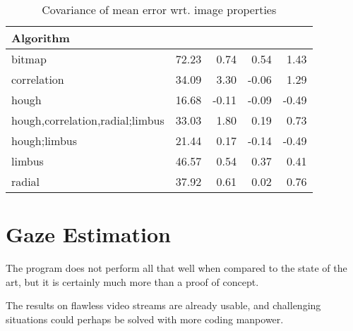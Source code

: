 \begin{table}[b!]
\centering
\begin{tabular}{l@{\hspace{1.5cm}}D{.}{.}{3.2}D{.}{.}{3.2}D{.}{.}{3.2}D{.}{.}{3.2}}
\toprule
\textbf{Algorithm} &  &  &  & \\
\midrule
bitmap & 72.23 & 0.74 & 0.54 & 1.43\\
correlation & 34.09 & 3.30 & -0.06 & 1.29\\
hough & 16.68 & -0.11 & -0.09 & -0.49\\
hough,correlation,radial;limbus & 33.03 & 1.80 & 0.19 & 0.73\\
hough;limbus & 21.44 & 0.17 & -0.14 & -0.49\\
limbus & 46.57 & 0.54 & 0.37 & 0.41\\
radial & 37.92 & 0.61 & 0.02 & 0.76\\
\bottomrule
\end{tabular}
\caption{Covariance of mean error wrt. image properties}\label{t:algo-covar}
\end{table}


\section{Gaze Estimation}

The program does not perform all that well when compared to the state of the art, but it is certainly much more than a proof of concept.

The results on flawless video streams are already usable, and challenging situations could perhaps be solved with more coding manpower.
\todo{\dots}
